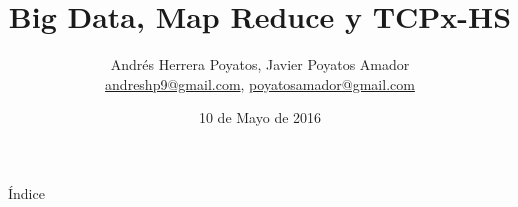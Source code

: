 \documentclass[compress]{beamer}
\title{Big Data, Map Reduce y TCPx-HS}
\author[Andrés Herrera Poyatos, Javier Poyatos Amador]{
	Andrés Herrera Poyatos, Javier Poyatos Amador \texorpdfstring{\\
		\href{mailto:andreshp9@gmail.com}{andreshp9@gmail.com}, \href{mailto:poyatosamador@gmail.com}{poyatosamador@gmail.com}
	}{}
}
\date{10 de Mayo de 2016}
\newcommand{\importsection}[1]{}           %
\begin{document}
	{
		\begin{frame}[plain]
			\titlepage
		\end{frame}			
	}

	\importsection{Motivacion.tex}

	\begin{frame}{Índice}
		\hypertarget{index}{}
		\tableofcontents
	\end{frame}
	
	\importsection{BigData.tex}

	\importsection{MapReduce.tex}

	\importsection{TPCx-HS.tex}

	\importsection{Conclusion.tex}
	
\end{document}
